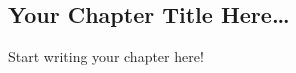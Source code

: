 \documentclass[../book]{subfiles}
\begin{document}
\begin{markdown}


\chapter{Your Chapter Title Here…}


Start writing your chapter here!


\end{markdown}
\end{document}
